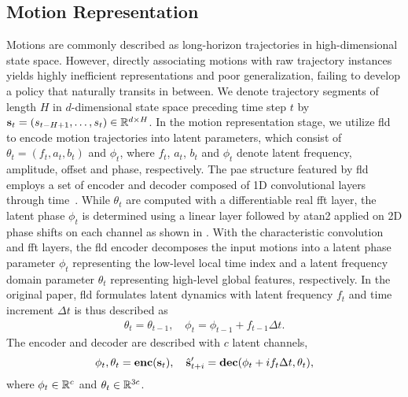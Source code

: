 \subsection{Motion Representation}
Motions are commonly described as long-horizon trajectories in high-dimensional state space.
However, directly associating motions with raw trajectory instances yields highly inefficient representations and poor generalization, failing to develop a policy that naturally transits in between.
We denote trajectory segments of length $H$ in $d$-dimensional state space preceding time step $t$ by $\mathbf{s}_t = (s_{t-H+1}, \dots, s_{t}) \in \mathbb R^{d \times H}$.
In the motion representation stage, we utilize \ac{fld}~\cite{fld} to encode motion trajectories into latent parameters, which consist of $\theta_t = (f_t, a_t, b_t)$ and $\phi_t$, where $f_t$, $a_t$, $b_t$ and $\phi_t$ denote latent frequency, amplitude, offset and phase, respectively.
The \ac{pae} structure featured by \ac{fld} employs a set of encoder and decoder composed of 1D convolutional layers through time~\cite{periodic_autoencoder}.
While $\theta_t$ are computed with a differentiable real \ac{fft} layer, the latent phase $\phi_t$ is determined using a linear layer followed by atan2 applied on 2D phase shifts on each channel as shown in .
With the characteristic convolution and \ac{fft} layers, the \ac{fld} encoder decomposes the input motions into a latent phase parameter $\phi_t$ representing the low-level local time index and a latent frequency domain parameter $\theta_t$ representing high-level global features, respectively.
In the original paper, \ac{fld} formulates latent dynamics with latent frequency $f_t$ and time increment $\Delta t$ is thus described as
\begin{equation}
\begin{split}
    \theta_t = \theta_{t-1}, \quad \phi_t = \phi_{t-1} + f_{t-1} \Delta t.
    \label{eqn:latent_dynamics}
\end{split}
\end{equation}
The encoder and decoder are described with $c$ latent channels, 
\begin{equation}
    \phi_t, \theta_t = \operatorname*{\textbf{enc}}(\mathbf{s}_t), \quad \hat{\mathbf{s}}'_{t+i} = \operatorname*{\textbf{dec}}(\phi_t + i f_t \Delta t, \theta_t),
    \label{eqn:periodic_assumption}
\end{equation}
where $\phi_t \in \mathbb R^c$ and $\theta_t \in \mathbb R^{3c}$.

